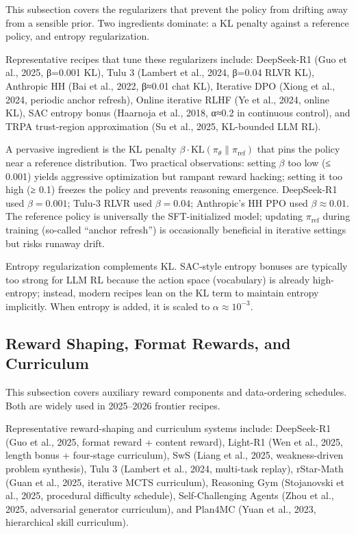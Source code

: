 \documentclass{article}
\begin{document}
This subsection covers the regularizers that prevent the policy from drifting away from a sensible prior. Two ingredients dominate: a KL penalty against a reference policy, and entropy regularization.

Representative recipes that tune these regularizers include: DeepSeek-R1 (Guo et al., 2025, β=0.001 KL), Tulu 3 (Lambert et al., 2024, β=0.04 RLVR KL), Anthropic HH (Bai et al., 2022, β≈0.01 chat KL), Iterative DPO (Xiong et al., 2024, periodic anchor refresh), Online iterative RLHF (Ye et al., 2024, online KL), SAC entropy bonus (Haarnoja et al., 2018, α≈0.2 in continuous control), and TRPA trust-region approximation (Su et al., 2025, KL-bounded LLM RL).

A pervasive ingredient is the KL penalty \(\beta \cdot \mathrm{KL}(\pi_\theta \| \pi_{\mathrm{ref}})\) that pins the policy near a reference distribution. Two practical observations: setting \(\beta\) too low (≤ 0.001) yields aggressive optimization but rampant reward hacking; setting it too high (≥ 0.1) freezes the policy and prevents reasoning emergence. DeepSeek-R1 used \(\beta=0.001\); Tulu-3 RLVR used \(\beta = 0.04\); Anthropic's HH PPO used \(\beta \approx 0.01\). The reference policy is universally the SFT-initialized model; updating \(\pi_{\mathrm{ref}}\) during training (so-called ``anchor refresh'') is occasionally beneficial in iterative settings \citep{xiong20242024} but risks runaway drift.

Entropy regularization complements KL. SAC-style entropy bonuses are typically too strong for LLM RL because the action space (vocabulary) is already high-entropy; instead, modern recipes lean on the KL term to maintain entropy implicitly. When entropy is added, it is scaled to \(\alpha \approx 10^{-3}\).

\subsection{Reward Shaping, Format Rewards, and Curriculum}\label{reward-shaping-format-rewards-and-curriculum}

This subsection covers auxiliary reward components and data-ordering schedules. Both are widely used in 2025--2026 frontier recipes.

Representative reward-shaping and curriculum systems include: DeepSeek-R1 (Guo et al., 2025, format reward + content reward), Light-R1 (Wen et al., 2025, length bonus + four-stage curriculum), SwS (Liang et al., 2025, weakness-driven problem synthesis), Tulu 3 (Lambert et al., 2024, multi-task replay), rStar-Math (Guan et al., 2025, iterative MCTS curriculum), Reasoning Gym (Stojanovski et al., 2025, procedural difficulty schedule), Self-Challenging Agents (Zhou et al., 2025, adversarial generator curriculum), and Plan4MC (Yuan et al., 2023, hierarchical skill curriculum).
\end{document}

